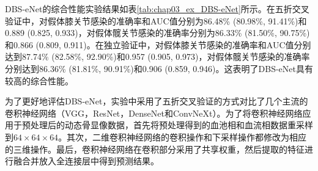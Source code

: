 DBS-eNet的综合性能实验结果如表\ref{tab:chap03_ex_DBS-eNet}所示。在五折交叉验证中，对假体膝关节感染的准确率和AUC值分别为86.48\% (80.98\%, 91.41\%)和0.889 (0.825, 0.933)，对假体髋关节感染的准确率分别为86.33\% (81.50\%, 90.75\%)和0.866 (0.809, 0.911)。在独立验证中，对假体膝关节感染的准确率和AUC值分别达到87.74\% (82.58\%, 92.90\%)和0.957 (0.905, 0.973)，对假体髋关节感染的准确率分别达到86.36\% (81.81\%, 90.91\%)和0.906 (0.859, 0.946)。这表明了DBS-eNet具有较高的综合性能。

为了更好地评估DBS-eNet，实验中采用了五折交叉验证的方式对比了几个主流的卷积神经网络（VGG\cite{Simonyan2014VeryDC}，ResNet\cite{he2016deep}，DenseNet\cite{huang2017densely}和ConvNeXt\cite{liu2022convnet}）。为了将卷积神经网络应用于预处理后的动态骨显像数据，首先将预处理得到的血池相和血流相数据重采样到\(64 \times 64 \times 64\)。其次，二维卷积神经网络的卷积操作和下采样操作都修改为相应的三维操作。最后，卷积神经网络在卷积部分采用了共享权重，然后提取的特征进行融合并放入全连接层中得到预测结果。

